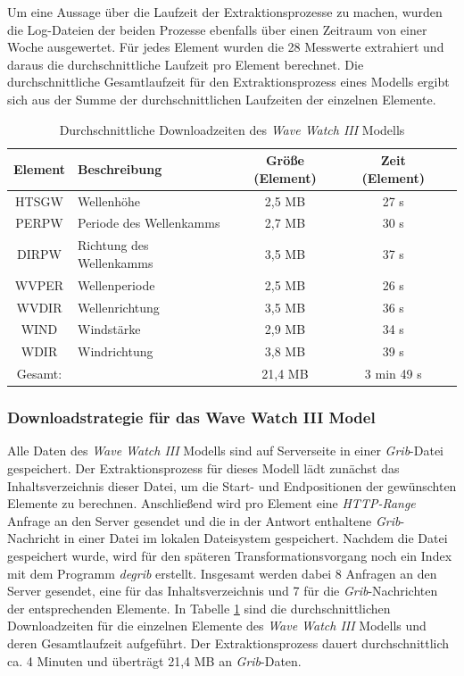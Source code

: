 Um eine Aussage über die Laufzeit der Extraktionsprozesse zu machen,
wurden die Log-Dateien der beiden Prozesse ebenfalls über einen
Zeitraum von einer Woche ausgewertet. Für jedes Element wurden die 28
Messwerte extrahiert und daraus die durchschnittliche Laufzeit pro
Element berechnet. Die durchschnittliche Gesamtlaufzeit für den
Extraktionsprozess eines Modells ergibt sich aus der Summe der
durchschnittlichen Laufzeiten der einzelnen Elemente.

\begin{table}[h]
  \centering
  {\sf
    \footnotesize
    \begin{longtable}{@{}clccc}
      \toprule
      \textbf{Element} & \textbf{Beschreibung} & \textbf{Größe (Element)} & \textbf{Zeit (Element)}  \\
      \midrule
      HTSGW & Wellenhöhe & 2,5 MB &  27 s \\
      PERPW & Periode des Wellenkamms & 2,7 MB &  30 s \\
      DIRPW & Richtung des Wellenkamms & 3,5 MB &  37 s \\
      WVPER & Wellenperiode & 2,5 MB &  26 s \\
      WVDIR & Wellenrichtung & 3,5 MB &  36 s \\
      WIND  & Windstärke & 2,9 MB &  34 s \\
      WDIR  & Windrichtung & 3,8 MB &  39 s \\
      \midrule
      Gesamt: & & 21,4 MB &  3 min 49 s \\
      \bottomrule
    \end{longtable}
  }
  \caption{Durchschnittliche Downloadzeiten des \textit{Wave Watch III} Modells}
  \label{tab:download_messung_ww3}
\end{table}

\subsubsection{Downloadstrategie für das Wave Watch III Model}
Alle Daten des \textit{Wave Watch III} Modells sind auf Serverseite in
einer \textit{Grib}-Datei gespeichert. Der Extraktionsprozess für
dieses Modell lädt zunächst das Inhaltsverzeichnis dieser Datei, um
die Start- und Endpositionen der gewünschten Elemente zu
berechnen. Anschließend wird pro Element eine \textit{HTTP-Range}
Anfrage an den Server gesendet und die in der Antwort enthaltene
\textit{Grib}-Nachricht in einer Datei im lokalen Dateisystem
gespeichert. Nachdem die Datei gespeichert wurde, wird für den
späteren Transformationsvorgang noch ein Index mit dem Programm
\textit{degrib} erstellt. Insgesamt werden dabei 8 Anfragen an den
Server gesendet, eine für das Inhaltsverzeichnis und 7 für die
\textit{Grib}-Nachrichten der entsprechenden Elemente. In Tabelle
\ref{tab:download_messung_ww3} sind die durchschnittlichen
Downloadzeiten für die einzelnen Elemente des \textit{Wave Watch III}
Modells und deren Gesamtlaufzeit aufgeführt. Der Extraktionsprozess
dauert durchschnittlich ca. 4 Minuten und überträgt 21,4 MB an
\textit{Grib}-Daten.

